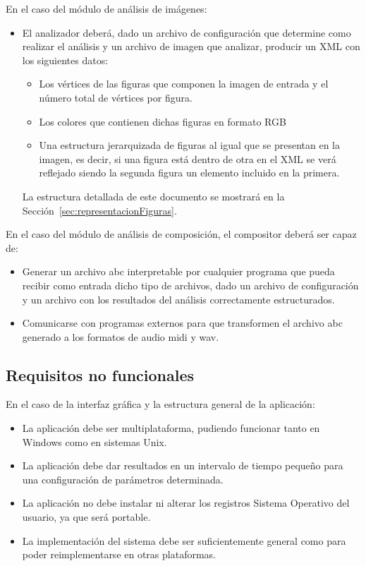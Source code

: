  
 En el caso del módulo de análisis de imágenes:
 \begin{itemize}
	\item El analizador deberá, dado un archivo de configuración que determine como realizar el análisis y un archivo de imagen que analizar, producir un XML con los siguientes datos:
	\begin{itemize}
		\item Los vértices de las figuras que componen la imagen de entrada y el número total de vértices por figura.
		\item Los colores que contienen dichas figuras en formato RGB
		\item Una estructura jerarquizada de figuras al igual que se presentan en la imagen, es decir, si una figura está dentro de otra en el XML se verá reflejado siendo la segunda figura un elemento incluido en la primera.
	\end{itemize}
	La estructura detallada de este documento se mostrará en la Sección~\ref{sec:representacionFiguras}.
 \end{itemize}
 \color{blue}
  En el caso del módulo de análisis de composición, el compositor deberá ser capaz de:\color{black}
 \begin{itemize}
	\item Generar un archivo abc interpretable por cualquier programa que pueda recibir como entrada dicho tipo de archivos, dado un archivo de configuración y un archivo con los resultados del análisis correctamente estructurados.
	\item Comunicarse con programas externos para que transformen el archivo abc generado a los formatos de audio midi y wav.
 \end{itemize}
 
\subsection{Requisitos no funcionales}

En el caso de la interfaz gráfica y la estructura general de la aplicación:

\begin{itemize}
	\item La aplicación debe ser multiplataforma, pudiendo funcionar tanto en Windows como en sistemas Unix.	
	\item La aplicación debe dar resultados en un intervalo de tiempo pequeño para una configuración de parámetros determinada.
	\item La aplicación no debe instalar ni alterar los registros Sistema Operativo del usuario, ya que será portable.
	\item La implementación del sistema debe ser suficientemente general como para poder reimplementarse en otras plataformas.
\end{itemize}

